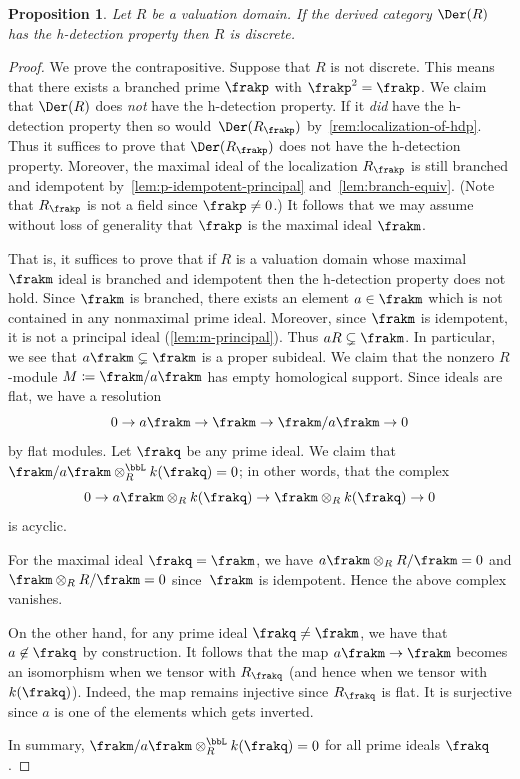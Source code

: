 \documentclass{amsart}
\numberwithin{equation}{section}%
\newtheorem{Prop}[equation]{Proposition}
\theoremstyle{remark}
\begin{document}
\begin{Prop}\label{prop:h-detection-implies-discrete}
	Let $R$ be a valuation domain. If the derived category $\Der(R)$ has the h-detection property then $R$ is discrete.
\end{Prop}

\begin{proof}
	We prove the contrapositive. Suppose that $R$ is not discrete. This means that there exists a branched prime $\frakp$ with $\frakp^2=\frakp$. We claim that $\Der(R)$ does \emph{not} have the h-detection property. If it \emph{did} have the h-detection property then so would~$\Der(R_{\frakp})$ by~\cref{rem:localization-of-hdp}. Thus it suffices to prove that $\Der(R_{\frakp})$ does not have the h-detection property. Moreover, the maximal ideal of the localization $R_{\frakp}$ is still branched and idempotent by~\cref{lem:p-idempotent-principal} and~\cref{lem:branch-equiv}. (Note that $R_{\frakp}$ is not a field since $\frakp \neq 0$.) It follows that we may assume without loss of generality that $\frakp$ is the maximal ideal $\frakm$.

	That is, it suffices to prove that if $R$ is a valuation domain whose maximal $\frakm$ ideal is branched and idempotent then the h-detection property does not hold. Since $\frakm$ is branched, there exists an element $a \in \frakm$ which is not contained in any nonmaximal prime ideal. Moreover, since $\frakm$ is idempotent, it is not a principal ideal (\cref{lem:m-principal}). Thus $aR \subsetneq \frakm$. In particular, we see that $a\frakm \subsetneq \frakm$ is a proper subideal. We claim that the nonzero $R$-module $M\coloneqq \frakm / a\frakm$ has empty homological support. Since ideals are flat, we have a resolution
	\[
		0 \to a\frakm \to \frakm \to \frakm/a\frakm \to 0
	\]
	by flat modules. Let $\frakq$ be any prime ideal. We claim that $\frakm/a\frakm \otimes_R^{\bbL} k(\frakq)=0$; in other words, that the complex
	\[
		0 \to a\frakm\otimes_R k(\frakq) \to \frakm\otimes_R k(\frakq) \to 0
	\]
	is acyclic.

	For the maximal ideal $\frakq=\frakm$, we have $a\frakm \otimes_R R/\frakm =0$ and $\frakm \otimes_R R/\frakm =0$ since~$\frakm$ is idempotent. Hence the above complex vanishes.

	On the other hand, for any prime ideal $\frakq \neq \frakm$, we have that $a \not\in\frakq$ by construction. It follows that the map $a\frakm \to \frakm$ becomes an isomorphism when we tensor with $R_{\frakq}$ (and hence when we tensor with $k(\frakq)$). Indeed, the map remains injective since $R_{\frakq}$ is flat. It is surjective since $a$ is one of the elements which gets inverted.

	In summary, $\frakm/a\frakm \otimes_R^{\bbL} k(\frakq)=0$ for all prime ideals $\frakq$.
\end{proof}
\end{document}
